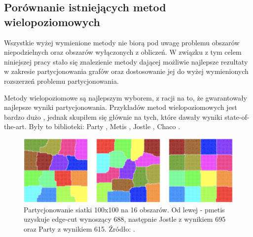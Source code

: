 \subsection{Porównanie istniejących metod wielopoziomowych}

Wszystkie wyżej wymienione metody nie biorą pod uwagę problemu obszarów niepodzielnych oraz obszarów wyłączonych z obliczeń.
W związku z tym celem niniejszej pracy stało się znalezienie metody dającej możliwie najlepsze rezultaty w zakresie partycjonowania grafów oraz
dostosowanie jej do wyżej wymienionych rozszerzeń problemu partycjonowania.

Metody wielopoziomowe są najlepszym wyborem, z racji na to, że gwarantowały najlepsze wyniki partycjonowania.
Przykładów metod wielopoziomowych jest bardzo dużo \cite{metis, jostle, Bui1993AHF, 103500, 185177, 279334, inproceedings, 129970, 10.1145/165939.165942},
jednak skupiłem się głównie na tych, które dawały wyniki state-of-the-art. Były to biblioteki:
Party \cite{1364754}, Metis \cite{metis}, Jostle \cite{jostle}, Chaco \cite{inproceedings}.

\begin{figure}[h]
    \centering
    \includegraphics[width=0.7\linewidth]{images/libraries-comparision}
    \caption{Partycjonowanie siatki 100x100 na 16 obszarów. Od lewej - pmetis \cite{metis} uzyskuje edge-cut wynoszący
    688, następnie Jostle \cite{jostle} z wynikiem 695 oraz Party \cite{1364754} z wynikiem 615. Źródło: \cite{1364754}.}
    \label{im:partitioning_results}
\end{figure}

